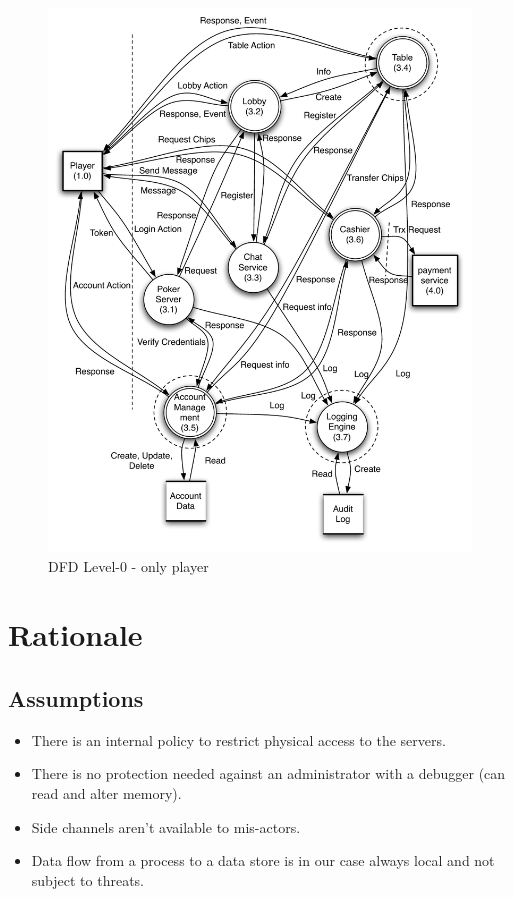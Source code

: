 \documentclass[a4paper,11pt]{report}
\begin{document}
\begin{figure}[p]
  \begin{center}
    \includegraphics[scale=0.7]{dfd_level_0_player}
  \end{center}
  \caption{DFD Level-0 - only player}\label{fig:level_0_player}
\end{figure}

\section{Rationale}
\subsection{Assumptions}
\begin{itemize}
\item There is an internal policy to restrict physical access to the servers. 
\item There is no protection needed against an administrator with a debugger (can read and alter memory).
\item Side channels aren't available to mis-actors.
\item Data flow from a process to a data store is in our case always local and not subject to threats.
\end{itemize}
\end{document}
